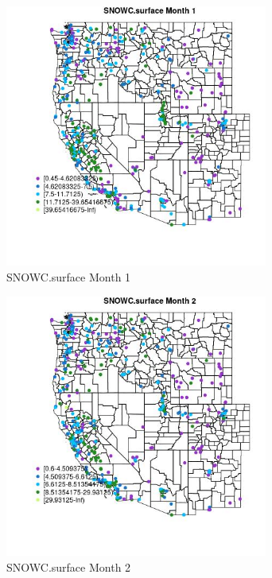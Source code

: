 \begin{figure} 
\centering  
\includegraphics[width=0.77\textwidth]{Code_Outputs/ML_input_report_ML_input_PM25_Step5_part_d_de_duplicated_aves_ML_input_MapObsMo1SNOWCsurface.jpg} 
\caption{\label{fig:ML_input_report_ML_input_PM25_Step5_part_d_de_duplicated_aves_ML_inputMapObsMo1SNOWCsurface}SNOWC.surface Month 1} 
\end{figure} 
 

\begin{figure} 
\centering  
\includegraphics[width=0.77\textwidth]{Code_Outputs/ML_input_report_ML_input_PM25_Step5_part_d_de_duplicated_aves_ML_input_MapObsMo2SNOWCsurface.jpg} 
\caption{\label{fig:ML_input_report_ML_input_PM25_Step5_part_d_de_duplicated_aves_ML_inputMapObsMo2SNOWCsurface}SNOWC.surface Month 2} 
\end{figure} 
 

